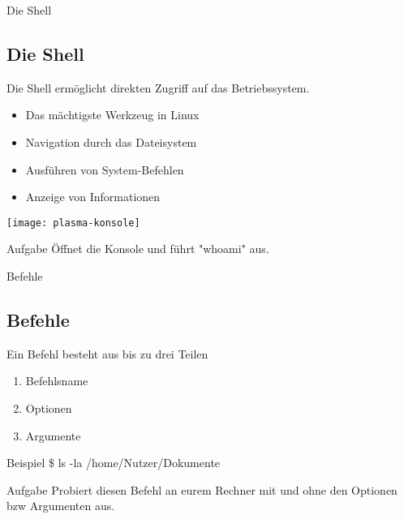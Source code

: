 \begin{frame}{Die Shell}
    \subsection{Die Shell}\label{subsec:die-shell}

    Die Shell ermöglicht direkten Zugriff auf das Betriebssystem.

    \begin{itemize}
        \item Das mächtigste Werkzeug in Linux
        \item Navigation durch das Dateisystem
        \item Ausführen von System-Befehlen
        \item Anzeige von Informationen
    \end{itemize}

    \vspace{0.5cm}
    \texttt{[image: plasma-konsole]}

    \vspace{0.5cm}
    \begin{alertblock}{Aufgabe}
        Öffnet die Konsole und führt "whoami" aus.
    \end{alertblock}

\end{frame}

\begin{frame}{Befehle}
    \subsection{Befehle}\label{subsec:befehle}

    Ein Befehl besteht aus bis zu drei Teilen

    \begin{enumerate}
        \item Befehlsname
        \item Optionen
        \item Argumente
    \end{enumerate}

    \vspace{0.5cm}
    \begin{exampleblock}{Beispiel}
        \$ ls -la /home/Nutzer/Dokumente
    \end{exampleblock}

    \vspace{0.5cm}
    \begin{alertblock}{Aufgabe}
        Probiert diesen Befehl an eurem Rechner mit und ohne den Optionen bzw Argumenten aus.
    \end{alertblock}

\end{frame}


